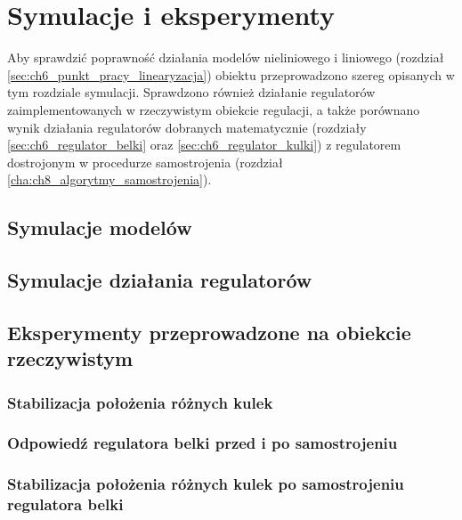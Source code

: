\chapter{Symulacje i eksperymenty}
\label{cha:ch9_symulacje_i_eksperymenty}

Aby sprawdzić poprawność działania modelów nieliniowego i liniowego (rozdział \ref{sec:ch6_punkt_pracy_linearyzacja}) obiektu przeprowadzono szereg opisanych w tym rozdziale symulacji. Sprawdzono również działanie regulatorów zaimplementowanych w rzeczywistym obiekcie regulacji, a także porównano wynik działania regulatorów dobranych matematycznie (rozdziały \ref{sec:ch6_regulator_belki} oraz \ref{sec:ch6_regulator_kulki}) z regulatorem dostrojonym w procedurze samostrojenia (rozdział \ref{cha:ch8_algorytmy_samostrojenia}).

\section{Symulacje modelów}
\label{sec:ch9_symulacje_modelow}


\section{Symulacje działania regulatorów}
\label{sec:ch9_symulacje_regulatorow}


\section{Eksperymenty przeprowadzone na obiekcie rzeczywistym}
\label{sec:ch9_eksperymenty}

\subsection{Stabilizacja położenia różnych kulek}
\label{subsec:ch9_stabilizacja_polozenia_roznych_kulek}

\subsection{Odpowiedź regulatora belki przed i po samostrojeniu}
\label{subsec:ch9_odp_regulatora_belki}

\subsection{Stabilizacja położenia różnych kulek po samostrojeniu regulatora belki}
\label{subsec:ch9_stabilizacja_polozenia_roznych_kulek_po_samostrojeniu}

